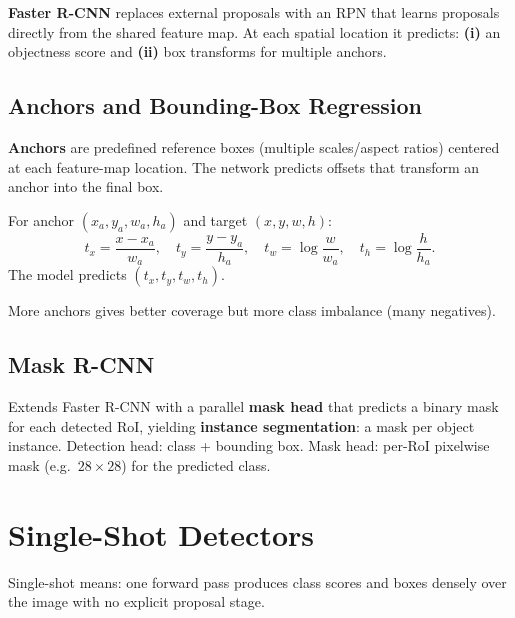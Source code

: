 \documentclass[11pt, oneside]{book}
\begin{document}
\begin{thmbox}[title={Reprojection Error Minimization}]
\begin{defbox}[title={Correlation and Convolution}]
\begin{defbox}[title={ReLU and Pooling}]
\begin{defbox}[title={Segmentation}]
\begin{defbox}[title={Graph-Based Segmentation}]
\begin{defbox}[title={U-Net}]
\begin{defbox}[title={Region Proposal Network (RPN)}]
\textbf{Faster R-CNN} replaces external proposals with an RPN that learns proposals directly from the shared feature map.
At each spatial location it predicts: \textbf{(i)} an objectness score and \textbf{(ii)} box transforms for multiple anchors.
\end{defbox}

\subsection{Anchors and Bounding-Box Regression}

\begin{defbox}[title={Anchors}]
\textbf{Anchors} are predefined reference boxes (multiple scales/aspect ratios) centered at each feature-map location.
The network predicts offsets that transform an anchor into the final box.
\end{defbox}

\begin{thmbox}[title={Anchor Offset Parameterization}]
For anchor $(x_a,y_a,w_a,h_a)$ and target $(x,y,w,h)$:
\[
t_x=\frac{x-x_a}{w_a},\quad t_y=\frac{y-y_a}{h_a},\quad
t_w=\log\frac{w}{w_a},\quad t_h=\log\frac{h}{h_a}.
\]
The model predicts $(t_x,t_y,t_w,t_h)$.
\end{thmbox}

More anchors gives better coverage but more class imbalance (many negatives).

\subsection{Mask R-CNN}

\begin{defbox}[title={Mask R-CNN}]
Extends Faster R-CNN with a parallel \textbf{mask head} that predicts a binary mask for each detected RoI,
yielding \textbf{instance segmentation}: a mask per object instance.
Detection head: class + bounding box. Mask head: per-RoI pixelwise mask (e.g.\ $28\times 28$) for the predicted class.
\end{defbox}

\section{Single-Shot Detectors}

Single-shot means: one forward pass produces class scores and boxes densely over the image with no explicit proposal stage.


\end{defbox}
\end{defbox}
\end{defbox}
\end{defbox}
\end{defbox}
\end{thmbox}
\end{document}
